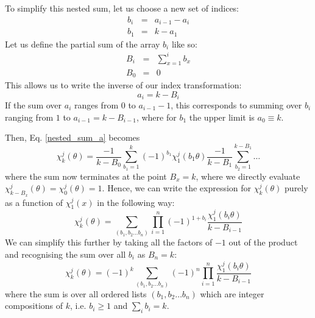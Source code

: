 \documentclass[12pt]{article}
\begin{document}
	To simplify this nested sum, let us choose a new set of indices:
	\begin{eqnarray}
	b_i &=& a_{i-1} - a_i\\
	b_1 &=& k - a_1
	\end{eqnarray}
	Let us define the partial sum of the array $b_i$ like so:
	\begin{eqnarray}
	B_i &=& \sum_{x=1}^i b_x\\
	B_0 &=& 0
	\end{eqnarray}
	This allows us to write the inverse of our index transformation:
	\begin{equation}
	a_i = k - B_i
	\end{equation}
	If the sum over $a_i$ ranges from $0$ to $a_{i-1}-1$, this corresponds to summing over $b_i$ ranging from $1$ to $a_{i-1}=k-B_{i-1}$, where for $b_1$ the upper limit is $a_0\equiv k$.
	
	Then, Eq. \ref{nested_sum_a} becomes
	\begin{equation}
	\chi^j_k(\theta) = \frac{-1}{k-B_0}\sum_{b_1=1}^k (-1)^{b_1} \chi^j_1(b_1\theta)\frac{-1}{k-B_1}\sum_{b_2=1}^{k-B_1}\dots
	\end{equation}
	where the sum now terminates at the point $B_x = k$, where we directly evaluate $\chi^j_{k-B_x}(\theta)=\chi^j_{0}(\theta)=1$. Hence, we can write the expression for $\chi^j_k(\theta)$ purely as a function of $\chi^j_1(x)$ in the following way:
	\begin{equation}
	\chi^j_k(\theta) = \sum_{(b_1, b_2\dots b_n)}\prod_{i=1}^n (-1)^{1+b_i}\frac{\chi^j_1(b_i\theta)}{k-B_{i-1}}
	\end{equation}
	We can simplify this further by taking all the factors of $-1$ out of the product and recognising the sum over all $b_i$ as $B_n=k$:
	\begin{equation} \label{partitioning_arrays_expression}
	\chi^j_k(\theta) = (-1)^k\sum_{(b_1, b_2\dots b_n)}(-1)^n\prod_{i=1}^n \frac{\chi^j_1(b_i\theta)}{k-B_{i-1}}
	\end{equation}
	where the sum is over all ordered lists $(b_1, b_2\dots b_n)$ which are integer compositions of $k$, i.e. $b_i\geq 1$ and $\sum_ib_i = k$.
	
\end{document}
